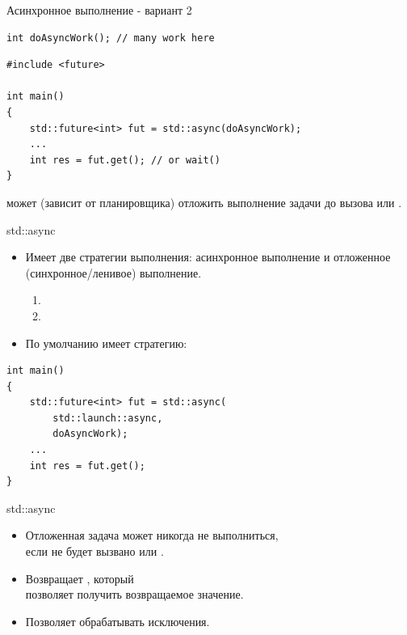 \documentclass{beamer}
\begin{document}
\begin{frame}[fragile]{Асинхронное выполнение - вариант 2}

\begin{lstlisting}
int doAsyncWork(); // many work here
\end{lstlisting}

\begin{lstlisting}
#include <future>

int main()
{
    std::future<int> fut = std::async(doAsyncWork);
    ...
    int res = fut.get(); // or wait()
}
\end{lstlisting}

 может (зависит от планировщика) отложить выполнение задачи до вызова  или .
\end{frame}

\begin{frame}[fragile]{std::async}
    \begin{itemize}
        \item Имеет две стратегии выполнения: асинхронное выполнение и
            отложенное (синхронное/ленивое) выполнение.
                \begin{enumerate}
                    \item {}
                    \item {}
                \end{enumerate}
        \item По умолчанию имеет стратегию:\\
\end{itemize}
\begin{lstlisting}
int main()
{
    std::future<int> fut = std::async(
        std::launch::async,
        doAsyncWork);
    ...
    int res = fut.get();
}
\end{lstlisting}
\end{frame}

\begin{frame}[fragile]{std::async}
\begin{itemize}
        \item Отложенная задача может никогда не выполниться,\\
            если не будет вызвано  или .
        \item Возвращает , который\\ позволяет
            получить возвращаемое значение.
        \item Позволяет обрабатывать исключения.
    \end{itemize}
\end{frame}
\end{document}
